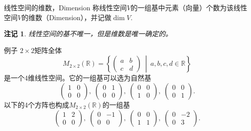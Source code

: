 \documentclass[10pt]{beamer}
\newtheorem{remark}[thm]{注记}
\begin{document}

\begin{frame}

\begin{block}{线性空间的维数，Dimension}
称线性空间$V$的一组基中元素（向量）个数为该线性空间$V$的维数（Dimension），并记做$\dim V$.
\end{block}

\vspace{2em}
\pause

\begin{remark}
线性空间的基不唯一，但是维数是唯一确定的。
\end{remark}

\end{frame}


\begin{frame}

\begin{block}{例子}
$2\times 2$矩阵全体
$$M_{2\times 2}(\mathbb{R}) = \left\{ \begin{pmatrix}
a & b \\ c & d \end{pmatrix} \ \middle|\ a,b,c,d \in \mathbb{R} \right\}$$
是一个4维线性空间。它的一组基可以选为自然基
$$\begin{pmatrix} 1 & 0 \\ 0 & 0 \end{pmatrix}, \; \begin{pmatrix} 0 & 1 \\ 0 & 0 \end{pmatrix}, \; \begin{pmatrix} 0 & 0 \\ 1 & 0 \end{pmatrix}, \; \begin{pmatrix} 0 & 0 \\ 0 & 1 \end{pmatrix}.$$
以下的4个方阵也构成$M_{2\times 2}(\mathbb{R})$的一组基
$$\begin{pmatrix} 1 & 2 \\ 0 & 0 \end{pmatrix}, \; \begin{pmatrix} 0 & -1 \\ 0 & 0 \end{pmatrix}, \; \begin{pmatrix} 0 & 0 \\ 1 & 1 \end{pmatrix}, \; \begin{pmatrix} 0 & -2 \\ 0 & 3 \end{pmatrix}.$$
\end{block}

\end{frame}
\end{document}
